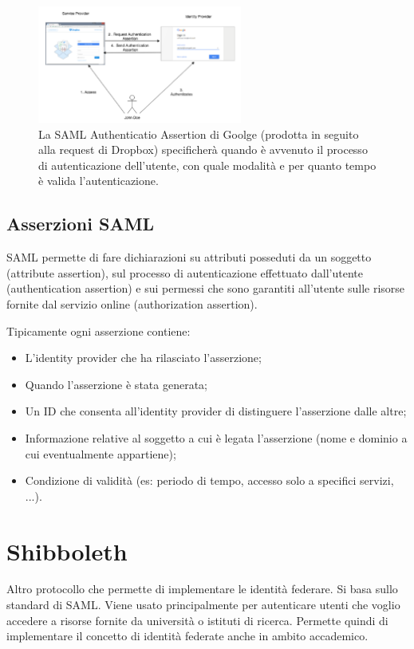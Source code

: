 \begin{figure}
    \centering
    \includegraphics[width=0.6\textwidth]{images/8-3.png}
    \caption{La SAML Authenticatio Assertion di Goolge (prodotta in seguito alla request di Dropbox) specificherà quando è avvenuto il processo di autenticazione dell'utente, con quale modalità e per quanto tempo è valida l'autenticazione.}
    \label{fig:8-3}
\end{figure}



\subsection{Asserzioni SAML}

SAML permette di fare dichiarazioni su attributi posseduti da un soggetto (attribute assertion), sul processo di autenticazione effettuato dall'utente (authentication assertion) e sui permessi che sono garantiti all'utente sulle risorse fornite dal servizio online (authorization assertion). 

\noindent Tipicamente ogni asserzione contiene:
\begin{itemize}
    \item L'identity provider che ha rilasciato l'asserzione;
    \item Quando l'asserzione è stata generata;
    \item Un ID che consenta all'identity provider di distinguere l'asserzione dalle altre;
    \item Informazione relative al soggetto a cui è legata l'asserzione (nome e dominio a cui eventualmente appartiene);
    \item Condizione di validità (es: periodo di tempo, accesso solo a specifici servizi, ...).
\end{itemize}

\section{Shibboleth}
Altro protocollo che permette di implementare le identità federare. Si basa sullo standard di SAML. 
Viene usato principalmente per autenticare utenti che voglio accedere a risorse fornite da università o istituti di ricerca. Permette quindi di implementare il concetto di identità federate anche in ambito accademico. 

